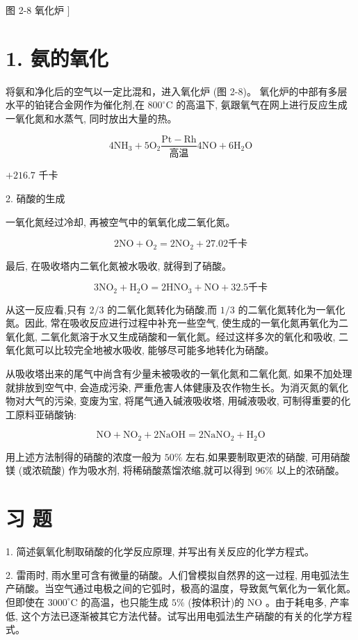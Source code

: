 \documentclass[10pt]{article}
\begin{document}
图 2-8 氧化炉 \(\rbrack\)

\section*{1. 氨的氧化}

将氨和净化后的空气以一定比混和，进入氧化炉 (图 2-8)。 氧化炉的中部有多层水平的铂铑合金网作为催化剂,在 \({800}^{ \circ }\mathrm{C}\) 的高温下, 氨跟氧气在网上进行反应生成一氧化氮和水蒸气, 同时放出大量的热。

\[
4{\mathrm{{NH}}}_{3} + 5{\mathrm{O}}_{2}\frac{\mathrm{{Pt}} - \mathrm{{Rh}}}{\text{ 高温 }}4\mathrm{{NO}} + 6{\mathrm{H}}_{2}\mathrm{O}
\]

\(+ {216.7}\) 千卡

2. 硝酸的生成

一氧化氮经过冷却, 再被空气中的氧氧化成二氧化氮。

\[
2\mathrm{{NO}} + {\mathrm{O}}_{2} = 2{\mathrm{{NO}}}_{2} + {27.02}\text{千卡}
\]

最后, 在吸收塔内二氧化氮被水吸收, 就得到了硝酸。

\[
3{\mathrm{{NO}}}_{2} + {\mathrm{H}}_{2}\mathrm{O} = 2{\mathrm{{HNO}}}_{3} + \mathrm{{NO}} + {32.5}\text{千卡}
\]

从这一反应看,只有 \(2/3\) 的二氧化氮转化为硝酸,而 \(1/3\) 的二氧化氮转化为一氧化氮。因此, 常在吸收反应进行过程中补充一些空气, 使生成的一氧化氮再氧化为二氧化氮, 二氧化氮溶于水又生成硝酸和一氧化氮。经过这样多次的氧化和吸收, 二氧化氮可以比较完全地被水吸收, 能够尽可能多地转化为硝酸。

从吸收塔出来的尾气中尚含有少量未被吸收的一氧化氮和二氧化氮, 如果不加处理就排放到空气中, 会造成污染, 严重危害人体健康及农作物生长。为消灭氮的氧化物对大气的污染, 变废为宝, 将尾气通入碱液吸收塔, 用碱液吸收, 可制得重要的化工原料亚硝酸钠:

\[
\mathrm{{NO}} + {\mathrm{{NO}}}_{2} + 2\mathrm{{NaOH}} = 2{\mathrm{{NaNO}}}_{2} + {\mathrm{H}}_{2}\mathrm{O}
\]

用上述方法制得的硝酸的浓度一般为 \({50}\%\) 左右,如果要制取更浓的硝酸, 可用硝酸镁 (或浓硫酸) 作为吸水剂, 将稀硝酸蒸馏浓缩,就可以得到 \({96}\%\) 以上的浓硝酸。

\section*{习 题}

1. 简述氨氧化制取硝酸的化学反应原理, 并写出有关反应的化学方程式。

2. 雷雨时, 雨水里可含有微量的硝酸。人们曾模拟自然界的这一过程, 用电弧法生产硝酸。当空气通过电极之间的它弧时，极高的温度，导致氮气氧化为一氧化氮。但即使在 \({3000}^{ \circ }\mathrm{C}\) 的高温，也只能生成 \(5\%\) (按体积计)的 \(\mathrm{{NO}}\) 。由于耗电多, 产率低, 这个方法已逐渐被其它方法代替。试写出用电弧法生产硝酸的有关的化学方程式。
\end{document}
